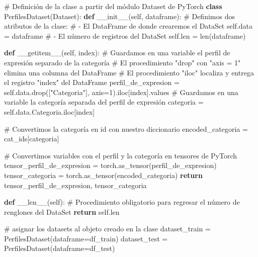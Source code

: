 \documentclass[
  10pt,
]{article}
\newenvironment{Shaded}{\begin{snugshade}}{\end{snugshade}}
\newcommand{\BuiltInTok}[1]{\textcolor[rgb]{0.00,0.23,0.31}{#1}}
\newcommand{\CommentTok}[1]{\textcolor[rgb]{0.37,0.37,0.37}{#1}}
\newcommand{\ControlFlowTok}[1]{\textcolor[rgb]{0.00,0.23,0.31}{\textbf{#1}}}
\newcommand{\DecValTok}[1]{\textcolor[rgb]{0.68,0.00,0.00}{#1}}
\newcommand{\FunctionTok}[1]{\textcolor[rgb]{0.28,0.35,0.67}{#1}}
\newcommand{\KeywordTok}[1]{\textcolor[rgb]{0.00,0.23,0.31}{\textbf{#1}}}
\newcommand{\NormalTok}[1]{\textcolor[rgb]{0.00,0.23,0.31}{#1}}
\newcommand{\OperatorTok}[1]{\textcolor[rgb]{0.37,0.37,0.37}{#1}}
\newcommand{\StringTok}[1]{\textcolor[rgb]{0.13,0.47,0.30}{#1}}
\newcommand{\VariableTok}[1]{\textcolor[rgb]{0.07,0.07,0.07}{#1}}
\begin{document}
\begin{Shaded}
\begin{Highlighting}[]
\CommentTok{\# Definición de la clase a partir del módulo Dataset de PyTorch}
\KeywordTok{class}\NormalTok{ PerfilesDataset(Dataset):}
    \KeywordTok{def} \FunctionTok{\_\_init\_\_}\NormalTok{(}\VariableTok{self}\NormalTok{, dataframe):}
        \CommentTok{\# Definimos dos atributos de la clase:}
        \CommentTok{\# {-} El DataFrame de donde crearemos el DataSet}
        \VariableTok{self}\NormalTok{.data }\OperatorTok{=}\NormalTok{ dataframe}
        \CommentTok{\# {-} El número de registros del DataSet}
        \VariableTok{self}\NormalTok{.}\BuiltInTok{len} \OperatorTok{=} \BuiltInTok{len}\NormalTok{(dataframe)}

    \KeywordTok{def} \FunctionTok{\_\_getitem\_\_}\NormalTok{(}\VariableTok{self}\NormalTok{, index):}
        \CommentTok{\# Guardamos en una variable el perfil de expresión separado de la categoría}
        \CommentTok{\# El procedimiento "drop" con "axis = 1" elimina una columna del DataFrame}
        \CommentTok{\# El procedimiento "iloc" localiza y entrega el registro "index" del DataFrame}
\NormalTok{        perfil\_de\_expresion }\OperatorTok{=} \VariableTok{self}\NormalTok{.data.drop([}\StringTok{"Categoria"}\NormalTok{], axis}\OperatorTok{=}\DecValTok{1}\NormalTok{).iloc[index].values}
        \CommentTok{\# Guardamos en una variable la categoría separada del perfil de expresión}
\NormalTok{        categoria }\OperatorTok{=} \VariableTok{self}\NormalTok{.data.Categoria.iloc[index]}

        \CommentTok{\# Convertimos la categoría en id con nuestro diccionario}
\NormalTok{        encoded\_categoria }\OperatorTok{=}\NormalTok{ cat\_ids[categoria]}

        \CommentTok{\# Convertimos variables con el perfil y la categoría en tensores de PyTorch}
\NormalTok{        tensor\_perfil\_de\_expresion }\OperatorTok{=}\NormalTok{ torch.as\_tensor(perfil\_de\_expresion)}
\NormalTok{        tensor\_categoria }\OperatorTok{=}\NormalTok{ torch.as\_tensor(encoded\_categoria)}
        \ControlFlowTok{return}\NormalTok{ tensor\_perfil\_de\_expresion, tensor\_categoria}

    \KeywordTok{def} \FunctionTok{\_\_len\_\_}\NormalTok{(}\VariableTok{self}\NormalTok{):}
        \CommentTok{\# Procedimiento obligatorio para regresar el número de renglones del DataSet}
        \ControlFlowTok{return} \VariableTok{self}\NormalTok{.}\BuiltInTok{len}


\CommentTok{\# asignar los datasets al objeto creado en la clase}
\NormalTok{dataset\_train }\OperatorTok{=}\NormalTok{ PerfilesDataset(dataframe}\OperatorTok{=}\NormalTok{df\_train)}
\NormalTok{dataset\_test }\OperatorTok{=}\NormalTok{ PerfilesDataset(dataframe}\OperatorTok{=}\NormalTok{df\_test)}
\end{Highlighting}
\end{Shaded}
\end{document}

